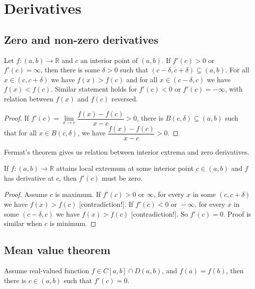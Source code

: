 \documentclass{article}
\newcommand{\R}{\mathbb R}
\begin{document}
\section{Derivatives}
\subsection{Zero and non-zero derivatives}
\begin{theorem}
    Let $ f \colon (a, b) \to \R $ and $ c $ an interior point of $ (a, b) $. If $ f'(c) > 0 $ or $ f'(c) = \infty $, then there is some $ \delta > 0 $ such that $ (c - \delta, c + \delta) \subseteq (a, b) $. For all $ x \in (c, c + \delta) $ we have $ f(x) > f(c) $ and for all $ x \in (c - \delta, c) $ we have $ f(x) < f(c) $. Similar statement holds for $ f'(c) < 0 $ or $ f'(c) = -\infty $, with relation between $ f(x) $ and $ f(c) $ reversed.
\end{theorem}

\begin{proof}
    If $ f'(c) = \lim\limits_{x \to c} \dfrac{f(x) - f(c)}{x - c} > 0 $, there is $ B(c, \delta) \subseteq (a, b) $ such that for all $ x \in B(c, \delta) $, we have $ \dfrac{f(x) - f(c)}{x - c} > 0 $.
\end{proof}

Fermat's theorem gives us relation between interior extrema and zero derivatives.
\begin{theorem}
    If $ f \colon (a, b) \to \R $ attains local extremum at some interior point $ c \in (a, b) $ and $ f $ has derivative at $ c $, then $ f'(c) $ must be zero.
\end{theorem}

\begin{proof}
    Assume $ c $ is maximum. If $ f'(c) > 0 \text{ or } \infty $, for every $ x $ in some $ (c, c + \delta) $ we have $ f(x) > f(c) $ [contradiction!]. If $ f'(c) < 0 \text{ or } -\infty $, for every $ x $ in some $ (c - \delta, c) $ we have $ f(x) > f(c) $ [contradiction!]. So $ f'(c) = 0 $. Proof is similar when $ c $ is minimum.
\end{proof}

\subsection{Mean value theorem}
\begin{theorem}
    Assume real-valued function $ f \in C[a, b] \cap D(a, b) $, and $ f(a) = f(b) $, then there is $ c \in (a, b) $ such that $ f'(c) = 0 $.
\end{theorem}
\end{document}
